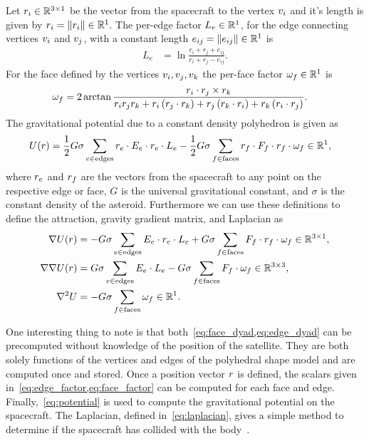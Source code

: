 \documentclass[journal]{new-aiaa}
\begin{document}
Let \( r_i \in \mathbb{R}^{3 \times 1} \) be the vector from the spacecraft to the vertex \( v_i \) and it's length is given by \( r_i = \left\| r_i \right\| \in \mathbb{R}^{1} \).
The per-edge factor \( L_e \in \mathbb{R}^{1}\), for the edge connecting vertices \( v_i \) and \( v_j \), with a constant length \( e_{ij} = \left\| e_{ij} \right\| \in \mathbb{R}^1\) is
\begin{align}\label{eq:edge_factor}
    L_e &= \ln \frac{r_i + r_j + e_{ij}}{r_i + r_j - e_{ij}}.
\end{align}
For the face defined by the vertices \( v_i, v_j, v_k \) the per-face factor \( \omega_f \in \mathbb{R}^{1} \) is
\begin{align}\label{eq:face_factor}
    \omega_f &= 2 \arctan \frac{r_i \cdot r_j \times r_k}{r_i r_j r_k + r_i \left( r_j \cdot r_k \right) + r_j \left( r_k \cdot r_i \right) + r_k \left( r_i \cdot r_j \right)} .
\end{align}
The gravitational potential due to a constant density polyhedron is given as
\begin{align}\label{eq:potential}
    U(r) &= \frac{1}{2} G \sigma \sum_{e \in \text{edges}} r_e \cdot E_e \cdot r_e \cdot L_e - \frac{1}{2}G \sigma \sum_{f \in \text{faces}} r_f \cdot F_f \cdot r_f \cdot \omega_f \in \mathbb{R}^1,
\end{align}
where \( r_e\) and \(r_f \) are the vectors from the spacecraft to any point on the respective edge or face, \( G\) is the universal gravitational constant, and \( \sigma \) is the constant density of the asteroid.
Furthermore we can use these definitions to define the attraction, gravity gradient matrix, and Laplacian as
\begin{align}
    \nabla U ( r ) &= -G \sigma \sum_{e \in \text{edges}} E_e \cdot r_e \cdot L_e + G \sigma \sum_{f \in \text{faces}} F_f \cdot r_f \cdot \omega_f \in \mathbb{R}^{3 \times 1} , \label{eq:attraction}\\
    \nabla \nabla U ( r ) &= G \sigma \sum_{e \in \text{edges}} E_e  \cdot L_e - G \sigma \sum_{f \in \text{faces}} F_f \cdot \omega_f \in \mathbb{R}^{3 \times 3}, \label{eq:gradient_matrix}\\
    \nabla^2 U &= -G \sigma \sum_{f \in \text{faces}}  \omega_f \in \mathbb{R}^1 .\label{eq:laplacian}
\end{align}

One interesting thing to note is that both~\cref{eq:face_dyad,eq:edge_dyad} can be precomputed without knowledge of the position of the satellite.
They are both solely functions of the vertices and edges of the polyhedral shape model and are computed once and stored.
Once a position vector \( r \) is defined, the scalars given in~\cref{eq:edge_factor,eq:face_factor} can be computed for each face and edge.
Finally,~\cref{eq:potential} is used to compute the gravitational potential on the spacecraft.
The Laplacian, defined in~\cref{eq:laplacian}, gives a simple method to determine if the spacecraft has collided with the body~\cite{werner1996}. 
\end{document}
